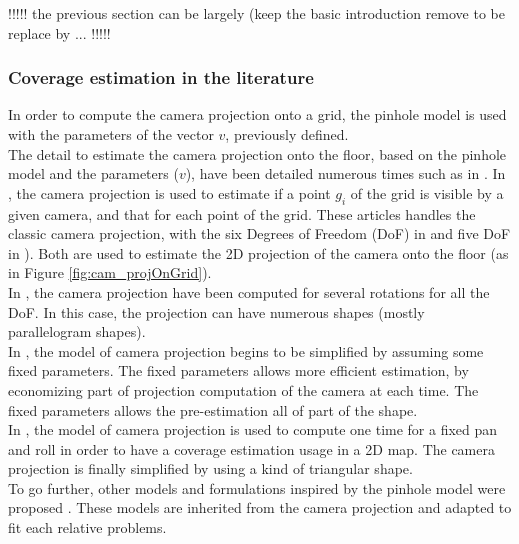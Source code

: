 !!!!! the previous section can be largely (keep the basic introduction remove to be replace by ... !!!!!
\fi
\subsubsection{Coverage estimation in the literature}


 In order to compute the camera projection onto a grid, the pinhole model is used with the parameters of the vector $v$, previously defined.\\
The detail to estimate the camera projection onto the floor, based on the pinhole model and the parameters ($v$), have been detailed numerous times such as in \cite{193*fu2014,181*wang2017,165*jiang2010}. In \cite{193*fu2014,181*wang2017,165*jiang2010}, the camera projection is used to estimate if a point $g_i$ of the grid is visible by a given camera, and that for each point of the grid. These articles handles the classic camera projection, with  the six Degrees of Freedom (DoF) in \citep{193*fu2014} and five DoF in \citep{181*wang2017}). Both are used to estimate the 2D projection of the camera onto the floor (as in Figure \ref{fig:cam_projOnGrid}). \\
In  \citep{193*fu2014}, the camera projection have been computed for several rotations for all the DoF. In this case, the projection can have numerous shapes (mostly parallelogram shapes).\\
In \citep{181*wang2017}, the model of camera projection begins to be simplified by assuming some fixed parameters. The fixed parameters allows more efficient estimation, by economizing part of projection computation of the camera at each time. The fixed parameters allows the pre-estimation  all of part of the shape.  \\
In \citep{165*jiang2010}, the model of camera projection is used to compute one time for a fixed pan and roll in order to have a coverage estimation usage in a 2D map. The camera projection is finally simplified by using a kind of triangular shape.\\
To go further, other models and formulations inspired by the pinhole model were proposed \cite{87*morsly2012,141*akbarzadeh2013,146*li2011,194*fu2010}. These models are inherited from the camera projection and adapted to fit each relative problems. \\
